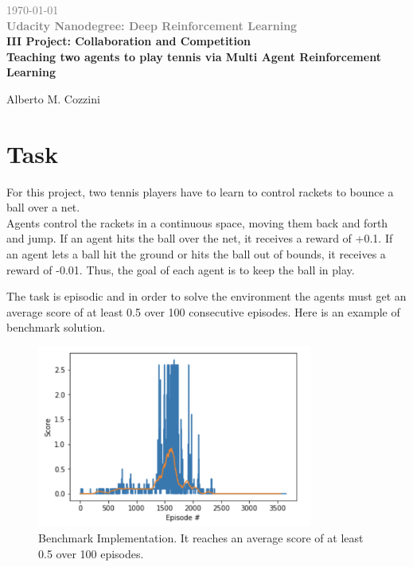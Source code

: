 \documentclass[pagenumber=off]{article}
\begin{document}
\begin{titlepage}
\begin{center}
\vspace{1cm}
{\textcolor{gray}\today}\\
{\textcolor{gray}{\bf Udacity Nanodegree: Deep Reinforcement Learning }}\\
\vspace{1.5cm}
{\textcolor{coolblack}{\huge \bf III Project: Collaboration and Competition}}\\
\vspace{0.5cm}
{\textcolor{coolblack}{\Large \bf  Teaching two agents to play tennis via Multi Agent Reinforcement Learning}}
\par
\vspace{0.5cm}
\vspace{6cm}
\end{center}
\tableofcontents

\vspace{4cm}

\begin{center}
{Alberto M. Cozzini}\\
\end{center}
\end{titlepage}

\section{Task}
For this project, two tennis players have to learn to control rackets to bounce a ball over a net.\\
Agents control the rackets in a continuous space, moving them back and forth and jump. 
If an agent hits the ball over the net, it receives a reward of +0.1. If an agent lets a ball hit the ground or hits the ball out of bounds, it receives a reward of -0.01. Thus, the goal of each agent is to keep the ball in play.

The task is episodic and in order to solve the environment the agents must get an average score of at least 0.5 over 100 consecutive episodes. Here is an example of benchmark solution.
\begin{figure}[!h]
  \centerline{\includegraphics[page=1, height=6cm, width=12 cm, angle=0]{./Plots/Benchmark_Score.png}}
  \caption{Benchmark Implementation. It reaches an average score of at least 0.5 over 100 episodes.}
\end{figure}
\end{document}
